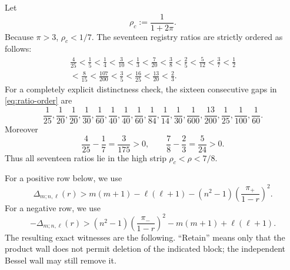 \documentclass[11pt]{article}
\newcommand{\Dlt}{\Delta}
\newcommand{\pimin}{\pi_-}
\newcommand{\pimax}{\pi_+}
\begin{document}
Let
\[
 \rho_c:=\frac1{1+2\pi}.
\]
Because \(\pi>3\), \(\rho_c<1/7\).  The seventeen registry ratios are
strictly ordered as follows:
\begin{equation}
\begin{split}
 \frac4{25}<\frac15<\frac14<\frac3{10}<\frac13<\frac7{20}
 <\frac38<\frac25<\frac5{12}<\frac37<\frac12\\
 <\frac8{15}<\frac{107}{200}<\frac35<\frac{16}{25}
 <\frac{13}{20}<\frac23.
\end{split}
\label{eq:ratio-order}
\end{equation}
For a completely explicit distinctness check, the sixteen consecutive
gaps in \eqref{eq:ratio-order} are
\begin{equation}
 \frac1{25},\frac1{20},\frac1{20},\frac1{30},\frac1{60},
 \frac1{40},\frac1{40},\frac1{60},\frac1{84},\frac1{14},
 \frac1{30},\frac1{600},\frac{13}{200},\frac1{25},
 \frac1{100},\frac1{60}.
 \label{eq:ratio-gaps}
\end{equation}
Moreover
\[
 \frac4{25}-\frac17=\frac3{175}>0,
 \qquad
 \frac78-\frac23=\frac5{24}>0.
\]
Thus all seventeen ratios lie in the high strip
\(\rho_c<\rho<7/8\).

For a positive row below, we use
\[
 \Dlt_{m;n,\ell}(r)>
 m(m+1)-\ell(\ell+1)
 -(n^2-1)\left(\frac{\pimax}{1-r}\right)^2.
\]
For a negative row, we use
\[
 -\Dlt_{m;n,\ell}(r)>
 (n^2-1)\left(\frac{\pimin}{1-r}\right)^2
 -m(m+1)+\ell(\ell+1).
\]
The resulting exact witnesses are the following.  ``Retain'' means only
that the product wall does not permit deletion of the indicated block;
the independent Bessel wall may still remove it.
\end{document}
